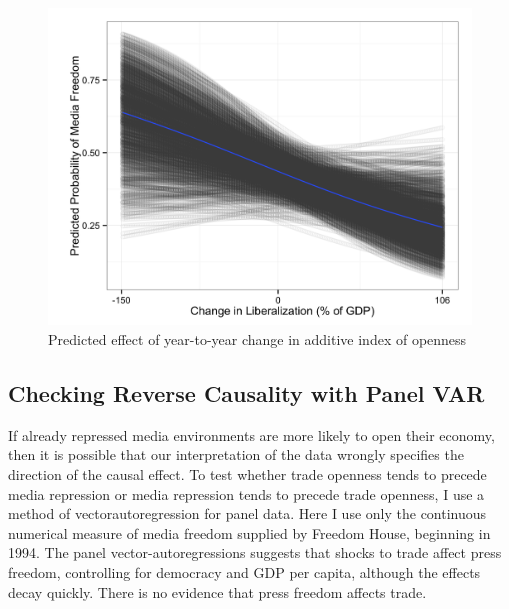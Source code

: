 \documentclass[12pt]{report}
\begin{document}
\begin{centering}
\pagebreak{}
\begin{figure}
\includegraphics[scale=0.2]{article2_liberalization_effect_plot.png}
\caption{Predicted effect of year-to-year change in additive index of openness}
\end{figure}

\end{centering}


\subsection{Checking Reverse Causality with Panel VAR}

If already repressed media environments are more likely to open their
economy, then it is possible that our interpretation of the data wrongly
specifies the direction of the causal effect. To test whether trade
openness tends to precede media repression or media repression tends
to precede trade openness, I use a method of vectorautoregression
for panel data. Here I use only the continuous numerical measure of
media freedom supplied by Freedom House, beginning in 1994. The
panel vector-autoregressions suggests that shocks to trade affect
press freedom, controlling for democracy and GDP per capita, although
the effects decay quickly. There is no evidence that press freedom
affects trade.
\end{document}
